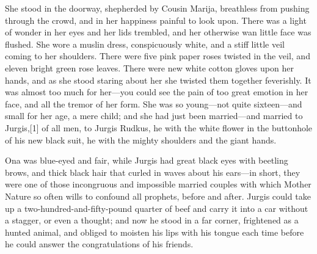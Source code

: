 \documentclass[
]{article}
\begin{document}
She stood in the doorway, shepherded by Cousin Marija, breathless from pushing through the crowd, and in her happiness painful to look upon. There was a light of wonder in her eyes and her lids trembled, and her otherwise wan little face was flushed. She wore a muslin dress, conspicuously white, and a stiff little veil coming to her shoulders. There were five pink paper roses twisted in the veil, and eleven bright green rose leaves. There were new white cotton gloves upon her hands, and as she stood staring about her she twisted them together feverishly. It was almost too much for her---you could see the pain of too great emotion in her face, and all the tremor of her form. She was so young---not quite sixteen---and small for her age, a mere child; and she had just been married---and married to Jurgis,{[}1{]} of all men, to Jurgis Rudkus, he with the white flower in the buttonhole of his new black suit, he with the mighty shoulders and the giant hands.

Ona was blue-eyed and fair, while Jurgis had great black eyes with beetling brows, and thick black hair that curled in waves about his ears---in short, they were one of those incongruous and impossible married couples with which Mother Nature so often wills to confound all prophets, before and after. Jurgis could take up a two-hundred-and-fifty-pound quarter of beef and carry it into a car without a stagger, or even a thought; and now he stood in a far corner, frightened as a hunted animal, and obliged to moisten his lips with his tongue each time before he could answer the congratulations of his friends.
\end{document}
